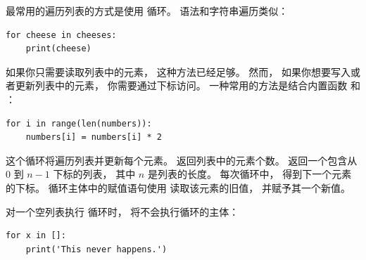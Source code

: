 
最常用的遍历列表的方式是使用  循环。  语法和字符串遍历类似：

\begin{lstlisting}
for cheese in cheeses:
    print(cheese)
\end{lstlisting}

%

如果你只需要读取列表中的元素， 这种方法已经足够。  然而， 如果你想要写入或者更新列表中的元素， 你需要通过下标访问。  一种常用的方法是结合内置函数  和  ：
  

\begin{lstlisting}
for i in range(len(numbers)):
    numbers[i] = numbers[i] * 2
\end{lstlisting}

%

这个循环将遍历列表并更新每个元素。   返回列表中的元素个数。   返回一个包含从 0 到 $n-1$ 下标的列表， 其中 $n$ 是列表的长度。
每次循环中，  得到下一个元素的下标。  循环主体中的赋值语句使用  读取该元素的旧值， 并赋予其一个新值。
  


对一个空列表执行  循环时， 将不会执行循环的主体：

\begin{lstlisting}
for x in []:
    print('This never happens.')
\end{lstlisting}

%


